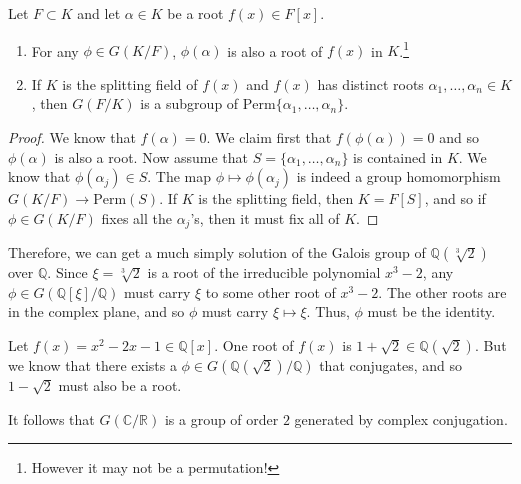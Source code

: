   \begin{lemma}
    \label{thm:f_auto_permute}
    Let $F \subset K$ and let $\alpha \in K$ be a root $f(x) \in F[x]$.
    \begin{enumerate}
      \item For any $\phi \in G(K/F)$, $\phi(\alpha)$ is also a root of $f(x)$ in $K$.\footnote{However it may not be a permutation!}
      \item If $K$ is the splitting field of $f(x)$ and $f(x)$ has distinct roots $\alpha_1, \ldots, \alpha_n \in K$, then $G(F/K)$ is a subgroup of $\mathrm{Perm}\{\alpha_1, \ldots, \alpha_n\}$. 
    \end{enumerate}
  \end{lemma}
  \begin{proof}
    We know that $f(\alpha) = 0$. We claim first that $f(\phi(\alpha)) = 0$ and so $\phi(\alpha)$ is also a root. Now assume that $S = \{\alpha_1, \ldots, \alpha_n\}$ is contained in $K$. We know that $\phi(\alpha_j) \in S$. The map $\phi \mapsto \phi(\alpha_j)$ is indeed a group homomorphism $G(K/F) \to \mathrm{Perm}(S)$. If $K$ is the splitting field, then $K = F[S]$, and so if $\phi \in G(K/F)$ fixes all the $\alpha_j$'s, then it must fix all of $K$. 
  \end{proof} 

  \begin{example}
    Therefore, we can get a much simply solution of the Galois group of $\mathbb{Q}(\sqrt[3]{2})$ over $\mathbb{Q}$. Since $\xi = \sqrt[3]{2}$ is a root of the irreducible polynomial $x^3 - 2$, any $\phi \in G(\mathbb{Q}[\xi]/\mathbb{Q})$ must carry $\xi$ to some other root of $x^3 - 2$. The other roots are in the complex plane, and so $\phi$ must carry $\xi \mapsto \xi$. Thus, $\phi$ must be the identity. 
  \end{example}

  \begin{example}
    Let $f(x) = x^2 - 2x - 1 \in \mathbb{Q}[x]$. One root of $f(x)$ is $1 + \sqrt{2} \in \mathbb{Q}(\sqrt{2})$. But we know that there exists a $\phi \in G(\mathbb{Q}(\sqrt{2})/\mathbb{Q})$ that conjugates, and so $1 - \sqrt{2}$ must also be a root. 
  \end{example} 

  \begin{example}
    It follows that $G(\mathbb{C}/\mathbb{R})$ is a group of order $2$ generated by complex conjugation. 
  \end{example} 

